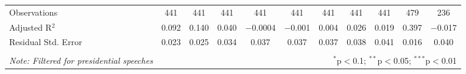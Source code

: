 \begin{table}[!htbp]
\begin{adjustbox}{width=1.35\textwidth}
\begin{tabular}{@{\extracolsep{5pt}}lcccccccccc}
Observations & 441 & 441 & 441 & 441 & 441 & 441 & 441 & 441 & 479 & 236 \\ 
Adjusted R$^{2}$ & 0.092 & 0.140 & 0.040 & $-$0.0004 & $-$0.001 & 0.004 & 0.026 & 0.019 & 0.397 & $-$0.017 \\ 
Residual Std. Error & 0.023 & 0.025 & 0.034 & 0.037 & 0.037 & 0.037 & 0.038 & 0.041 & 0.016 & 0.040 \\ 
\hline 
\hline \\[-1.8ex] 
\textit{Note: Filtered for presidential speeches}  & \multicolumn{10}{r}{$^{*}$p$<$0.1; $^{**}$p$<$0.05; $^{***}$p$<$0.01} \\ 
\end{tabular} 
\end{adjustbox}
\end{table} 
